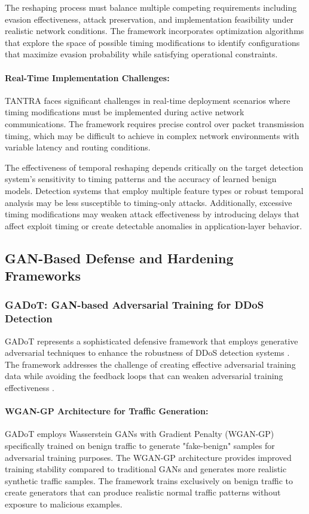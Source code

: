 The reshaping process must balance multiple competing requirements including evasion effectiveness, attack preservation, and implementation feasibility under realistic network conditions. The framework incorporates optimization algorithms that explore the space of possible timing modifications to identify configurations that maximize evasion probability while satisfying operational constraints.

\paragraph{Real-Time Implementation Challenges:}
TANTRA faces significant challenges in real-time deployment scenarios where timing modifications must be implemented during active network communications. The framework requires precise control over packet transmission timing, which may be difficult to achieve in complex network environments with variable latency and routing conditions.

The effectiveness of temporal reshaping depends critically on the target detection system's sensitivity to timing patterns and the accuracy of learned benign models. Detection systems that employ multiple feature types or robust temporal analysis may be less susceptible to timing-only attacks. Additionally, excessive timing modifications may weaken attack effectiveness by introducing delays that affect exploit timing or create detectable anomalies in application-layer behavior.

\subsection{GAN-Based Defense and Hardening Frameworks}

\subsubsection{GADoT: GAN-based Adversarial Training for DDoS Detection}

GADoT represents a sophisticated defensive framework that employs generative adversarial techniques to enhance the robustness of DDoS detection systems \cite{he2023adversarial}. The framework addresses the challenge of creating effective adversarial training data while avoiding the feedback loops that can weaken adversarial training effectiveness \cite{he2023adversarial}.

\paragraph{WGAN-GP Architecture for Traffic Generation:}
GADoT employs Wasserstein GANs with Gradient Penalty (WGAN-GP) specifically trained on benign traffic to generate "fake-benign" samples for adversarial training purposes. The WGAN-GP architecture provides improved training stability compared to traditional GANs and generates more realistic synthetic traffic samples. The framework trains exclusively on benign traffic to create generators that can produce realistic normal traffic patterns without exposure to malicious examples.

